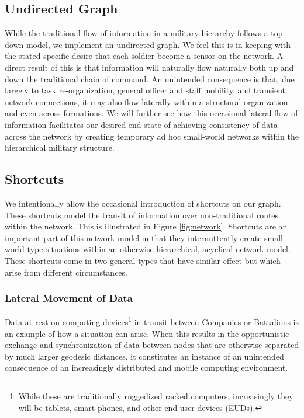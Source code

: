 \documentclass[10pt]{./IEEEtran}
\begin{document}
\subsection{Undirected Graph}
While the traditional flow of information in a military hierarchy follows a top-down model, we implement an undirected graph.  We feel this is in keeping with the stated specific desire that each soldier become a sensor on the network\cite{Patton:2003}.  A direct result of this is that information will naturally flow naturally both up and down the traditional chain of command.  An unintended consequence is that, due largely to task re-organization, general officer and staff mobility, and transient network connections, it may also flow laterally within a structural organization and even across formations.  We will further see how this occasional lateral flow of information facilitates our desired end state of achieving consistency of data across the network by creating temporary ad hoc small-world networks within the hierarchical military structure.

\subsection{Shortcuts}
We intentionally allow the occasional introduction of shortcuts on our graph.  These shortcuts model the transit of information over non-traditional routes within the network.  This is illustrated in Figure \ref{fig:network}.  Shortcuts are an important part of this network model in that they intermittently create small-world type situations\cite{Vahdat:2000} within an otherwise hierarchical, acyclical network model.  These shortcuts come in two general types that have similar effect but which arise from different circumstances.

\subsubsection{Lateral Movement of Data} 
Data at rest on computing devices\footnote{While these are traditionally ruggedized racked computers, increasingly they will be tablets, smart phones, and other end user devices (EUDs).} in transit between Companies or Battalions is an example of how a situation can arise.  When this results in the opportunistic exchange and synchronization of data between nodes that are otherwise separated by much larger geodesic distances,  it constitutes an instance of an unintended consequence of an increasingly distributed and mobile computing environment.
\end{document}
